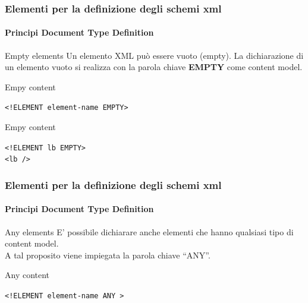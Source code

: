 \begin{frame}
    \frametitle{Elementi per la definizione degli schemi xml}
    \framesubtitle{Principi Document Type Definition}
    \addtocounter{nframe}{1}

    \begin{block}{Empty elements}
        Un elemento XML può essere vuoto (empty). La dichiarazione di un elemento vuoto si realizza con la parola chiave \textbf{EMPTY} come content model.
    \end{block}

    \begin{block}{Empy content}
    \begin{center}\texttt{<!ELEMENT element-name EMPTY>}\end{center}
    \end{block}

    \begin{block}{Empy content}
        \begin{center}
            \texttt{<!ELEMENT lb EMPTY>}
            \\\texttt{<lb />}
        \end{center}
    \end{block}

\end{frame}


\begin{frame}
    \frametitle{Elementi per la definizione degli schemi xml}
    \framesubtitle{Principi Document Type Definition}
    \addtocounter{nframe}{1}

    \begin{block}{Any elements}
        E' possibile dichiarare anche elementi che hanno qualsiasi tipo di content model.
        \\ A tal proposito viene impiegata la parola chiave  ``ANY''.
    \end{block}

    \begin{block}{Any content}
    \begin{center}\texttt{<!ELEMENT element-name ANY >}\end{center}
    \end{block}
    
\end{frame}

